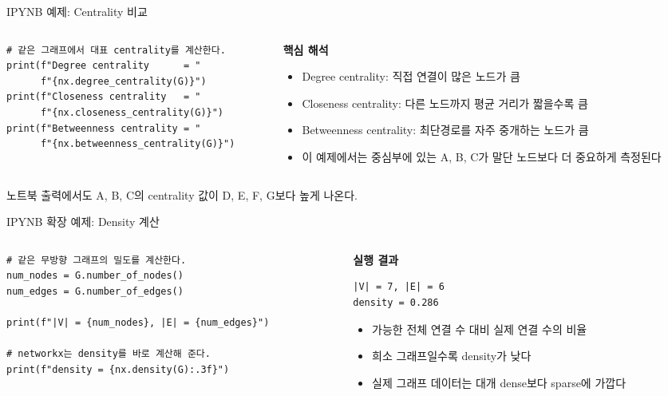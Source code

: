 \begin{frame}[fragile]{IPYNB 예제: Centrality 비교}
\begin{columns}[T,onlytextwidth]
\begin{column}{0.56\textwidth}
\begin{lstlisting}
# 같은 그래프에서 대표 centrality를 계산한다.
print(f"Degree centrality      = "
      f"{nx.degree_centrality(G)}")
print(f"Closeness centrality   = "
      f"{nx.closeness_centrality(G)}")
print(f"Betweenness centrality = "
      f"{nx.betweenness_centrality(G)}")
\end{lstlisting}
\end{column}
\begin{column}{0.4\textwidth}
\scriptsize
\textbf{핵심 해석}
\begin{itemize}
  \item Degree centrality: 직접 연결이 많은 노드가 큼
  \item Closeness centrality: 다른 노드까지 평균 거리가 짧을수록 큼
  \item Betweenness centrality: 최단경로를 자주 중개하는 노드가 큼
  \item 이 예제에서는 중심부에 있는 A, B, C가 말단 노드보다 더 중요하게 측정된다
\end{itemize}
\end{column}
\end{columns}
\vspace{0.4em}
\footnotesize
노트북 출력에서도 A, B, C의 centrality 값이 D, E, F, G보다 높게 나온다.
\end{frame}

\begin{frame}[fragile]{IPYNB 확장 예제: Density 계산}
\begin{columns}[T,onlytextwidth]
\begin{column}{0.56\textwidth}
\begin{lstlisting}
# 같은 무방향 그래프의 밀도를 계산한다.
num_nodes = G.number_of_nodes()
num_edges = G.number_of_edges()

print(f"|V| = {num_nodes}, |E| = {num_edges}")

# networkx는 density를 바로 계산해 준다.
print(f"density = {nx.density(G):.3f}")
\end{lstlisting}
\end{column}
\begin{column}{0.4\textwidth}
\small
\textbf{실행 결과}
\begin{verbatim}
|V| = 7, |E| = 6
density = 0.286
\end{verbatim}
\vspace{0.4em}
\begin{itemize}
  \item 가능한 전체 연결 수 대비 실제 연결 수의 비율
  \item 희소 그래프일수록 density가 낮다
  \item 실제 그래프 데이터는 대개 dense보다 sparse에 가깝다
\end{itemize}
\end{column}
\end{columns}
\end{frame}

